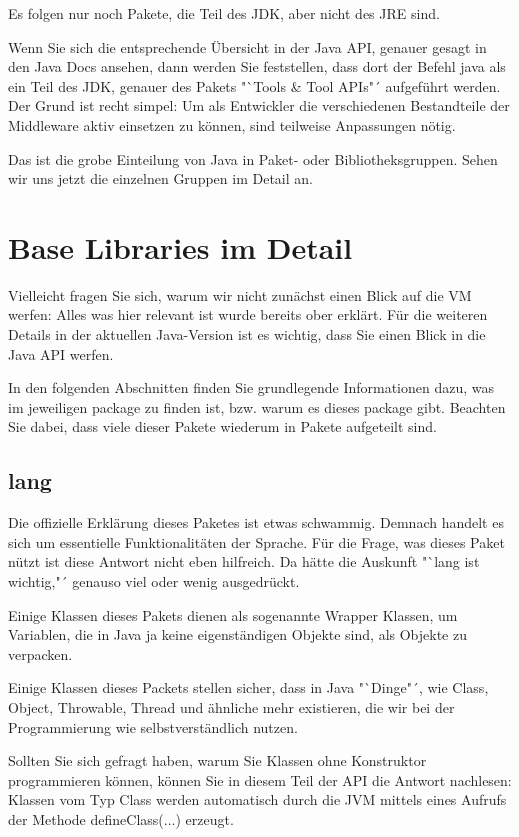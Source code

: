 Es folgen nur noch Pakete, die Teil des JDK, aber nicht des JRE sind.

Wenn Sie sich die entsprechende Übersicht in der Java API, genauer gesagt in den Java Docs ansehen, dann werden Sie feststellen, dass dort der Befehl java als ein Teil des JDK, genauer des Pakets "`Tools \& Tool APIs"´ aufgeführt werden. Der Grund ist recht simpel: Um als Entwickler die verschiedenen Bestandteile der Middleware aktiv einsetzen zu können, sind teilweise Anpassungen nötig.

Das ist die grobe Einteilung von Java in Paket- oder Bibliotheksgruppen. Sehen wir uns jetzt die einzelnen Gruppen im Detail an.

\section{Base Libraries im Detail}

Vielleicht fragen Sie sich, warum wir nicht zunächst einen Blick auf die VM werfen: Alles was hier relevant ist wurde bereits ober erklärt. Für die weiteren Details in der aktuellen Java-Version ist es wichtig, dass Sie einen Blick in die Java API werfen.

In den folgenden Abschnitten finden Sie grundlegende Informationen dazu, was im jeweiligen package zu finden ist, bzw. warum es dieses package gibt. Beachten Sie dabei, dass viele dieser Pakete wiederum in Pakete aufgeteilt sind.

\subsection{lang}

Die offizielle Erklärung dieses Paketes ist etwas schwammig. Demnach handelt es sich um essentielle Funktionalitäten der Sprache. Für die Frage, was dieses Paket nützt ist diese Antwort nicht eben hilfreich. Da hätte die Auskunft "`lang ist wichtig,"´ genauso viel oder wenig ausgedrückt.

Einige Klassen dieses Pakets dienen als sogenannte Wrapper Klassen, um Variablen, die in Java ja keine eigenständigen Objekte sind, als Objekte zu verpacken.

Einige Klassen dieses Packets stellen sicher, dass in Java "`Dinge"´, wie Class, Object, Throwable, Thread und ähnliche mehr existieren, die wir bei der Programmierung wie selbstverständlich nutzen.

Sollten Sie sich gefragt haben, warum Sie Klassen ohne Konstruktor programmieren können, können Sie in diesem Teil der API die Antwort nachlesen: Klassen vom Typ Class werden automatisch durch die JVM mittels eines Aufrufs der Methode defineClass(...) erzeugt.

